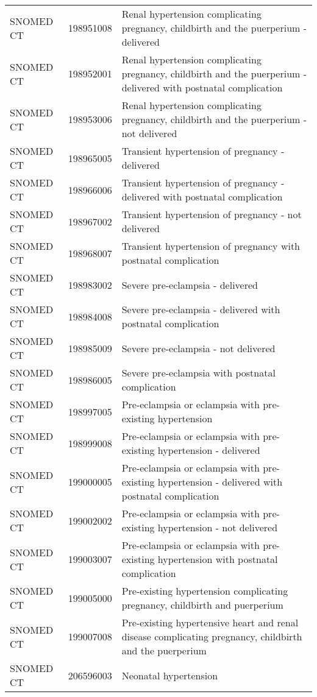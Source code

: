 \begin{longtable}{p{}p{}p{}}
  SNOMED CT & 198951008 & Renal hypertension complicating pregnancy, childbirth and the puerperium - delivered \\ 
  SNOMED CT & 198952001 & Renal hypertension complicating pregnancy, childbirth and the puerperium - delivered with postnatal complication \\ 
  SNOMED CT & 198953006 & Renal hypertension complicating pregnancy, childbirth and the puerperium - not delivered \\ 
  SNOMED CT & 198965005 & Transient hypertension of pregnancy - delivered \\ 
  SNOMED CT & 198966006 & Transient hypertension of pregnancy - delivered with postnatal complication \\ 
  SNOMED CT & 198967002 & Transient hypertension of pregnancy - not delivered \\ 
  SNOMED CT & 198968007 & Transient hypertension of pregnancy with postnatal complication \\ 
  SNOMED CT & 198983002 & Severe pre-eclampsia - delivered \\ 
  SNOMED CT & 198984008 & Severe pre-eclampsia - delivered with postnatal complication \\ 
  SNOMED CT & 198985009 & Severe pre-eclampsia - not delivered \\ 
  SNOMED CT & 198986005 & Severe pre-eclampsia with postnatal complication \\ 
  SNOMED CT & 198997005 & Pre-eclampsia or eclampsia with pre-existing hypertension \\ 
  SNOMED CT & 198999008 & Pre-eclampsia or eclampsia with pre-existing hypertension - delivered \\ 
  SNOMED CT & 199000005 & Pre-eclampsia or eclampsia with pre-existing hypertension - delivered with postnatal complication \\ 
  SNOMED CT & 199002002 & Pre-eclampsia or eclampsia with pre-existing hypertension - not delivered \\ 
  SNOMED CT & 199003007 & Pre-eclampsia or eclampsia with pre-existing hypertension with postnatal complication \\ 
  SNOMED CT & 199005000 & Pre-existing hypertension complicating pregnancy, childbirth and puerperium \\ 
  SNOMED CT & 199007008 & Pre-existing hypertensive heart and renal disease complicating pregnancy, childbirth and the puerperium \\ 
  SNOMED CT & 206596003 & Neonatal hypertension \\ 

\end{longtable}
